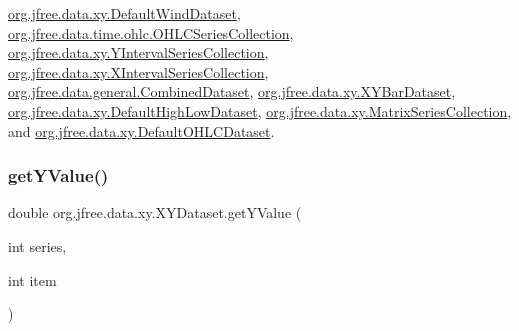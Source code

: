 \mbox{\hyperlink{classorg_1_1jfree_1_1data_1_1xy_1_1_default_wind_dataset_a51ae6185e5c71a07e8e2f496e101e868}{org.\+jfree.\+data.\+xy.\+Default\+Wind\+Dataset}}, \mbox{\hyperlink{classorg_1_1jfree_1_1data_1_1time_1_1ohlc_1_1_o_h_l_c_series_collection_a39ab3e7c0f3444b23cf9d768a5c52cd8}{org.\+jfree.\+data.\+time.\+ohlc.\+O\+H\+L\+C\+Series\+Collection}}, \mbox{\hyperlink{classorg_1_1jfree_1_1data_1_1xy_1_1_y_interval_series_collection_a68019ee85c039bec59b0a3a61989d131}{org.\+jfree.\+data.\+xy.\+Y\+Interval\+Series\+Collection}}, \mbox{\hyperlink{classorg_1_1jfree_1_1data_1_1xy_1_1_x_interval_series_collection_ae156ad8d79e2278653592a74680ce835}{org.\+jfree.\+data.\+xy.\+X\+Interval\+Series\+Collection}}, \mbox{\hyperlink{classorg_1_1jfree_1_1data_1_1general_1_1_combined_dataset_a87e02aef2783486fbe4be09ae4f1e3bf}{org.\+jfree.\+data.\+general.\+Combined\+Dataset}}, \mbox{\hyperlink{classorg_1_1jfree_1_1data_1_1xy_1_1_x_y_bar_dataset_a737db1e347fb9cb8b75179a54cf38287}{org.\+jfree.\+data.\+xy.\+X\+Y\+Bar\+Dataset}}, \mbox{\hyperlink{classorg_1_1jfree_1_1data_1_1xy_1_1_default_high_low_dataset_a0a62365f2ccccaf19cd49e003daeb5bc}{org.\+jfree.\+data.\+xy.\+Default\+High\+Low\+Dataset}}, \mbox{\hyperlink{classorg_1_1jfree_1_1data_1_1xy_1_1_matrix_series_collection_a7b873b64cb261ff072a480f22e29b505}{org.\+jfree.\+data.\+xy.\+Matrix\+Series\+Collection}}, and \mbox{\hyperlink{classorg_1_1jfree_1_1data_1_1xy_1_1_default_o_h_l_c_dataset_aa36cc16a07371b3e5027f2a9343bb24f}{org.\+jfree.\+data.\+xy.\+Default\+O\+H\+L\+C\+Dataset}}.

\mbox{\label{interfaceorg_1_1jfree_1_1data_1_1xy_1_1_x_y_dataset_a5e86389417eb5ed7b663a952ca370914}} 
\subsubsection{\texorpdfstring{get\+Y\+Value()}{getYValue()}}
{\footnotesize\ttfamily double org.\+jfree.\+data.\+xy.\+X\+Y\+Dataset.\+get\+Y\+Value (\begin{DoxyParamCaption}\item[{int}]{series,  }\item[{int}]{item }\end{DoxyParamCaption})}


